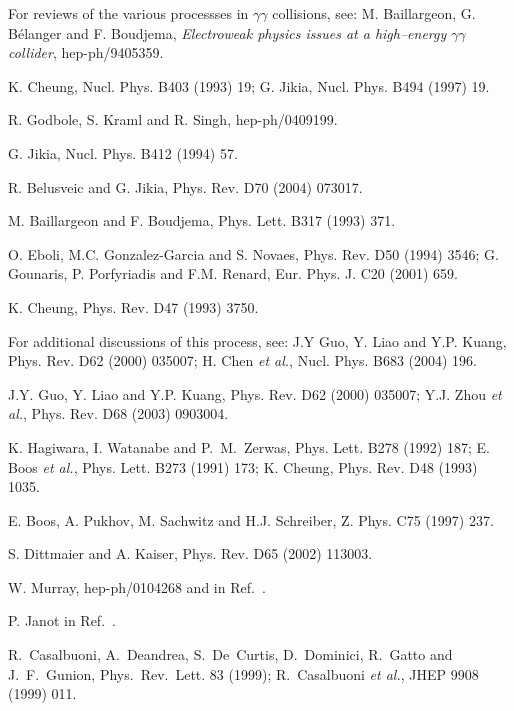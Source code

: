 \begin{thebibliography}{999}
 For reviews of the various processses in $\gamma 
\gamma$ collisions, see: M. Baillargeon, G. B\'elanger and F. Boudjema, 
{\it Electroweak physics issues at a high--energy $\gamma \gamma$ collider},
hep-ph/9405359.

 K. Cheung, Nucl. Phys. B403 (1993) 19; 
G. Jikia, Nucl. Phys. B494 (1997) 19. 

 R. Godbole, S. Kraml and R. Singh, hep-ph/0409199.  

 G. Jikia, Nucl. Phys. B412 (1994) 57. 
 
 R. Belusveic and G. Jikia, Phys. Rev. D70 (2004) 073017.   

 M. Baillargeon and F. Boudjema, Phys. Lett. B317 (1993) 371.  

 O. Eboli, M.C. Gonzalez-Garcia and S. Novaes, Phys. Rev. 
D50 (1994) 3546; G. Gounaris, P. Porfyriadis and F.M. Renard, Eur. Phys. J. 
C20 (2001) 659.   

 K. Cheung, Phys. Rev. D47 (1993) 3750.

 For additional discussions of this process, see: J.Y Guo, Y. 
Liao and Y.P. Kuang, Phys. Rev. D62 (2000) 035007; H. Chen  {\it et al.}, Nucl. 
Phys. B683 (2004) 196.  

 J.Y. Guo, Y. Liao and Y.P. Kuang, Phys. Rev. D62 (2000) 
035007; Y.J. Zhou {\it et al.}, Phys. Rev. D68 (2003) 0903004.

 K. Hagiwara, I. Watanabe and P.~M.~Zerwas, Phys. Lett. B278 
(1992) 187; E. Boos {\it et al.}, Phys. Lett. B273 (1991) 173; K. Cheung, 
Phys. Rev. D48 (1993) 1035. 

 E. Boos, A. Pukhov, M. Sachwitz and H.J. Schreiber, 
Z. Phys. C75 (1997) 237. 
 

 S. Dittmaier and A. Kaiser, Phys. Rev. D65 (2002) 113003. 

 W. Murray, hep-ph/0104268 and in Ref.~\cite{mu-machine2}.

 P. Janot in Ref.~\cite{mu-machine2}.

 R.~Casalbuoni, A.~Deandrea, S.~De~Curtis, 
D.~Dominici, R.~Gatto and J.~F.~Gunion, Phys.\ Rev.\ Lett. 83 (1999); 
R.~Casalbuoni {\it et al.}, JHEP 9908 (1999) 011.


\end{thebibliography}
